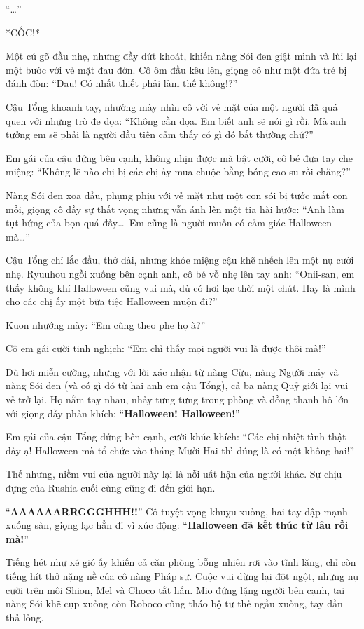 \documentclass[../main.tex]{subfiles}
\begin{document}
``\dots''

*CỐC!*

Một cú gõ đầu nhẹ, nhưng đầy dứt khoát, khiến nàng Sói đen giật mình và lùi lại một bước với vẻ mặt đau đớn. Cô ôm đầu kêu lên, giọng cô như một đứa trẻ bị đánh đòn: ``Đau! Có nhất thiết phải làm thế không!?''

Cậu Tổng khoanh tay, nhướng mày nhìn cô với vẻ mặt của một người đã quá quen với những trò đe dọa: ``Không cần dọa. Em biết anh sẽ nói gì rồi. Mà anh tưởng em sẽ phải là người đầu tiên cảm thấy có gì đó bất thường chứ?''

Em gái của cậu đứng bên cạnh, không nhịn được mà bật cười, cô bé đưa tay che miệng: ``Không lẽ nào chị bị các chị ấy mua chuộc bằng bóng cao su rồi chăng?''

Nàng Sói đen xoa đầu, phụng phịu với vẻ mặt như một con sói bị tước mất con mồi, giọng cô đầy sự thất vọng nhưng vẫn ánh lên một tia hài hước: ``Anh làm tụt hứng của bọn quá đấy\dots\ Em cũng là người muốn có cảm giác Halloween mà\dots''

Cậu Tổng chỉ lắc đầu, thở dài, nhưng khóe miệng cậu khẽ nhếch lên một nụ cười nhẹ. Ryuuhou ngồi xuống bên cạnh anh, cô bé vỗ nhẹ lên tay anh: ``Onii-san, em thấy không khí Halloween cũng vui mà, dù có hơi lạc thời một chút. Hay là mình cho các chị ấy một bữa tiệc Halloween muộn đi?''

Kuon nhướng mày: ``Em cũng theo phe họ à?''

Cô em gái cười tinh nghịch: ``Em chỉ thấy mọi người vui là được thôi mà!''

Dù hơi miễn cưỡng, nhưng với lời xác nhận từ nàng Cừu, nàng Người máy và nàng Sói đen (và có gì đó từ hai anh em cậu Tổng), cả ba nàng Quỷ giới lại vui vẻ trở lại. Họ nắm tay nhau, nhảy tưng tưng trong phòng và đồng thanh hô lớn với giọng đầy phấn khích: ``\textbf{Halloween! Halloween!}''

Em gái của cậu Tổng đứng bên cạnh, cười khúc khích: ``Các chị nhiệt tình thật đấy ạ! Halloween mà tổ chức vào tháng Mười Hai thì đúng là có một không hai!''

Thế nhưng, niềm vui của người này lại là nỗi uất hận của người khác. Sự chịu đựng của Rushia cuối cùng cũng đi đến giới hạn.

``\textbf{AAAAAARRGGGHHH!!}'' Cô tuyệt vọng khuỵu xuống, hai tay đập mạnh xuống sàn, giọng lạc hẳn đi vì xúc động: ``\textbf{Halloween đã kết thúc từ lâu rồi mà!}''

Tiếng hét như xé gió ấy khiến cả căn phòng bỗng nhiên rơi vào tĩnh lặng, chỉ còn tiếng hít thở nặng nề của cô nàng Pháp sư. Cuộc vui dừng lại đột ngột, những nụ cười trên môi Shion, Mel và Choco tắt hẳn. Mio đứng lặng người bên cạnh, tai nàng Sói khẽ cụp xuống còn Roboco cũng tháo bộ tư thế ngầu xuống, tay dần thả lỏng.
\end{document}
